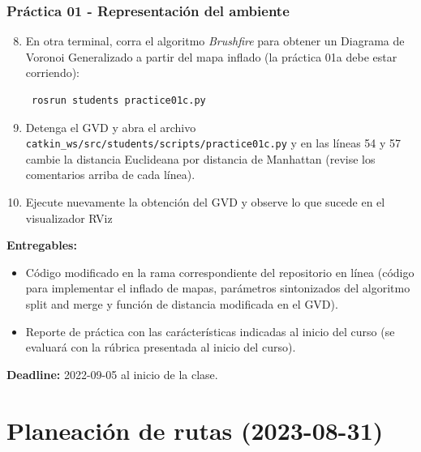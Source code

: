 \begin{frame}[containsverbatim]\frametitle{Práctica 01 - Representación del ambiente}
    \begin{enumerate}
    \setcounter{enumi}{7}
  \item En otra terminal, corra el algoritmo \textit{Brushfire} para obtener un Diagrama de Voronoi Generalizado a partir del mapa inflado (la práctica 01a debe estar corriendo):
\begin{verbatim}
 rosrun students practice01c.py
\end{verbatim}

  \item Detenga el GVD y abra el archivo \texttt{catkin\_ws/src/students/scripts/practice01c.py} y en las líneas 54 y 57 cambie la distancia Euclideana por distancia de Manhattan (revise los comentarios arriba de cada línea).
  \item Ejecute nuevamente la obtención del GVD y observe lo que sucede en el visualizador RViz
  \end{enumerate}

  \textbf{Entregables:}
  \begin{itemize}
  \item Código modificado en la rama correspondiente del repositorio en línea (código para implementar el inflado de mapas, parámetros sintonizados del algoritmo split and merge y función de distancia modificada en el GVD). 
  \item Reporte de práctica con las carácterísticas indicadas al inicio del curso (se evaluará con la rúbrica presentada al inicio del curso). 
  \end{itemize}
  \textbf{Deadline: } 2022-09-05 al inicio de la clase. 
\end{frame}

\section{Planeación de rutas (2023-08-31)}

